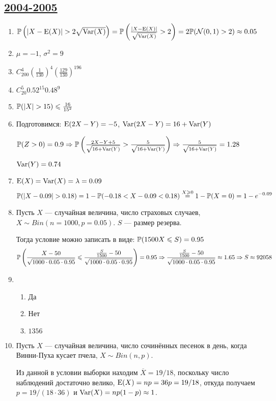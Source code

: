 \subsection[2004-2005]{\hyperref[sec:kr_01_2004_2005]{2004-2005}}
\label{sec:sol_kr_01_2004_2005}


\begin{enumerate}
\item $\P\left(|X-\E(X)|>2\sqrt{\Var(X)}\right) = \P\left(\frac{|X-\E(X)|}{\sqrt{\Var(X)}} > 2\right) = 2\P(\cN(0,1) >2) \approx 0.05$
\item $\mu = -1$, $\sigma^2 = 9$
\item $C_{200}^4 \left(\frac{1}{130}\right)^4 \left(\frac{129}{130}\right)^{196}$
\item $C_{20}^5 0.52^{15}0.48^9$
\item $\P(|X| > 15) \leq \frac{16}{15^2}$
\item Подготовимся: $\E(2X-Y) = -5$, $\Var(2X-Y) = 16 + \Var(Y)$

$ \P(Z>0) = 0.9 \Rightarrow \P\left(\frac{2X-Y+5}{\sqrt{16+\Var(Y)}} > \frac{5}{\sqrt{16+\Var(Y)}}\right) \Rightarrow \frac{5}{\sqrt{16+\Var(Y)}} = 1.28  $

$ \Var(Y) = 0.74$
\item $\E(X) = \Var(X) = \lambda = 0.09$
\[
\P(| X - 0.09| > 0.18) = 1 - \P(-0.18 < X - 0.09 < 0.18)  \stackrel{X\geq0}{=} 1 - \P(X=0) = 1 - e^{-0.09}
\]
\item Пусть $X$ — случайная величина, число страховых случаев, $X \sim Bin(n=1000, p=0.05)$. $S$ — размер резерва.

Тогда условие можно записать в виде: $\P(1500X \leq S) = 0.95$
\[
\P\left(\frac{X - 50}{\sqrt{1000 \cdot 0.05 \cdot 0.95}} \leq \frac{\frac{S}{1500}-50}{\sqrt{1000 \cdot 0.05 \cdot 0.95}} \right) =0.95 \Rightarrow \frac{\frac{S}{1500}-50}{\sqrt{1000 \cdot 0.05 \cdot 0.95}} \approx 1.65 \Rightarrow S \approx 92058
\]
\item
\begin{enumerate}
\item Да
\item Нет
\item $1356$
\end{enumerate}
\item Пусть $X$ — случайная величина, число сочинённых песенок в день, когда Винни-Пуха кусает пчела, $X \sim Bin(n,p)$.

Из данной в условии выборки находим $\overline{X} = 19/18$, поскольку число наблюдений достаточно велико, $\E(X) = np = 36p = 19/18$, откуда получаем $p=19/(18\cdot36)$ и $\Var(X) = np(1-p) \approx 1$.


\end{enumerate}
